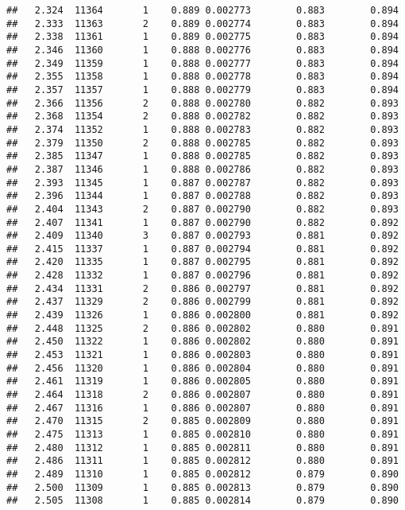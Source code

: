 \documentclass[
]{book}
\begin{document}
\begin{verbatim}
##   2.324  11364       1    0.889 0.002773        0.883        0.894
##   2.333  11363       2    0.889 0.002774        0.883        0.894
##   2.338  11361       1    0.889 0.002775        0.883        0.894
##   2.346  11360       1    0.888 0.002776        0.883        0.894
##   2.349  11359       1    0.888 0.002777        0.883        0.894
##   2.355  11358       1    0.888 0.002778        0.883        0.894
##   2.357  11357       1    0.888 0.002779        0.883        0.894
##   2.366  11356       2    0.888 0.002780        0.882        0.893
##   2.368  11354       2    0.888 0.002782        0.882        0.893
##   2.374  11352       1    0.888 0.002783        0.882        0.893
##   2.379  11350       2    0.888 0.002785        0.882        0.893
##   2.385  11347       1    0.888 0.002785        0.882        0.893
##   2.387  11346       1    0.888 0.002786        0.882        0.893
##   2.393  11345       1    0.887 0.002787        0.882        0.893
##   2.396  11344       1    0.887 0.002788        0.882        0.893
##   2.404  11343       2    0.887 0.002790        0.882        0.893
##   2.407  11341       1    0.887 0.002790        0.882        0.892
##   2.409  11340       3    0.887 0.002793        0.881        0.892
##   2.415  11337       1    0.887 0.002794        0.881        0.892
##   2.420  11335       1    0.887 0.002795        0.881        0.892
##   2.428  11332       1    0.887 0.002796        0.881        0.892
##   2.434  11331       2    0.886 0.002797        0.881        0.892
##   2.437  11329       2    0.886 0.002799        0.881        0.892
##   2.439  11326       1    0.886 0.002800        0.881        0.892
##   2.448  11325       2    0.886 0.002802        0.880        0.891
##   2.450  11322       1    0.886 0.002802        0.880        0.891
##   2.453  11321       1    0.886 0.002803        0.880        0.891
##   2.456  11320       1    0.886 0.002804        0.880        0.891
##   2.461  11319       1    0.886 0.002805        0.880        0.891
##   2.464  11318       2    0.886 0.002807        0.880        0.891
##   2.467  11316       1    0.886 0.002807        0.880        0.891
##   2.470  11315       2    0.885 0.002809        0.880        0.891
##   2.475  11313       1    0.885 0.002810        0.880        0.891
##   2.480  11312       1    0.885 0.002811        0.880        0.891
##   2.486  11311       1    0.885 0.002812        0.880        0.891
##   2.489  11310       1    0.885 0.002812        0.879        0.890
##   2.500  11309       1    0.885 0.002813        0.879        0.890
##   2.505  11308       1    0.885 0.002814        0.879        0.890

\end{verbatim}
\end{document}
